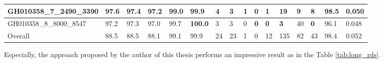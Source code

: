 \begin{table}[]
{\begin{tabular}{|l|l|l|l|l|l|l|l|l|l|l|l|l|l|l|l|}
			GH010358\_7\_2490\_3390   & 97.6          & 97.4          & 97.2          & 99.0                                                   & 99.9                                                   & 4          & 3                                                    & \textbf{1}                                           & \textbf{0}                                           & 1          & 19         & 9                                                     & 8                                                    & 98.5          & 0.050          \\ \hline
			GH010358\_8\_8000\_8547   & 97.2          & 97.3          & 97.0          & 99.7                                                   & \textbf{100.0}                                         & 3          & 3                                                    & 0                                                    & \textbf{0}                                           & \textbf{0} & \textbf{3} & 40                                                    & \textbf{0}                                           & 96.1          & 0.048          \\ \hline
			Overall                   & 88.5          & 88.5          & 88.1          & 99.1                                                   & 99.9                                                   & 24         & 23                                                   & 1                                                    & 0                                                    & 12         & 135        & 82                                                    & 43                                                   & 98.4          & 0.052          \\ \hline
		\end{tabular}%
	}
\end{table}
\raggedbottom
Especially, the approach proposed by the author of this thesis performs an impressive result as in the Table \ref{tab:long_rds}.
